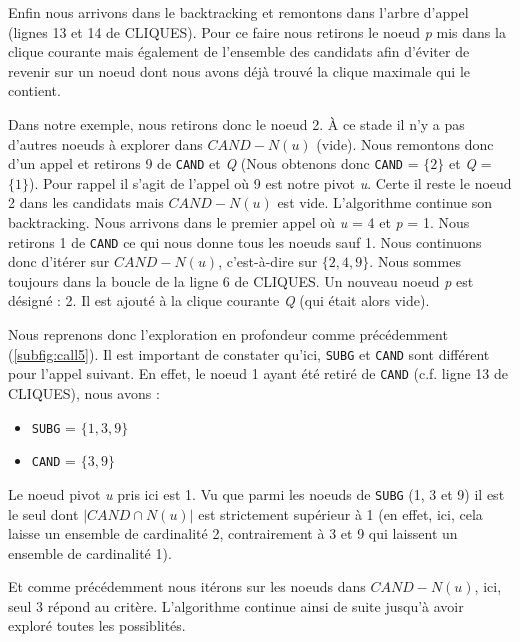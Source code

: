 \documentclass[12pt,a4paper]{article}
\begin{document}
Enfin nous arrivons dans le backtracking et remontons dans l'arbre d'appel (lignes 13 et 14 de CLIQUES). Pour ce faire nous retirons le noeud \emph{p} mis dans la clique courante mais également de l'ensemble des candidats afin d'éviter de revenir sur un noeud dont nous avons déjà trouvé la clique maximale qui le contient.

Dans notre exemple, nous retirons donc le noeud 2. À ce stade il n'y a pas d'autres noeuds à explorer dans \(CAND - N(u)\) (vide). Nous remontons donc d'un appel et retirons 9 de \texttt{CAND} et \emph{Q} (Nous obtenons donc \texttt{CAND} = \(\{2\}\) et \emph{Q} = \(\{1\}\)). Pour rappel il s'agit de l'appel où 9 est notre pivot \emph{u}. Certe il reste le noeud 2 dans les candidats mais \(CAND - N(u)\) est vide.
L'algorithme continue son backtracking. Nous arrivons dans le premier appel où \emph{u} = 4 et \emph{p} = 1. Nous retirons 1 de \texttt{CAND} ce qui nous donne tous les noeuds sauf 1. Nous continuons donc d'itérer sur \(CAND - N(u)\), c'est-à-dire sur \(\{2, 4, 9\}\). Nous sommes toujours dans la boucle de la ligne 6 de CLIQUES. Un nouveau noeud \emph{p} est désigné : 2. Il est ajouté à la clique courante \emph{Q} (qui était alors vide).

Nous reprenons donc l'exploration en profondeur comme précédemment (\ref{subfig:call5}). Il est important de constater qu'ici, \texttt{SUBG} et \texttt{CAND} sont différent pour l'appel suivant. En effet, le noeud 1 ayant été retiré de \texttt{CAND} (c.f. ligne 13 de CLIQUES), nous avons :

\begin{itemize}
  \item \texttt{SUBG} = \(\{1, 3, 9\}\)
  \item \texttt{CAND} = \(\{3, 9\}\)
\end{itemize}
Le noeud pivot \emph{u} pris ici est 1. Vu que parmi les noeuds de \texttt{SUBG} (1, 3 et 9) il est le seul dont \(|CAND \cap N(u)|\) est strictement supérieur à 1 (en effet, ici, cela laisse un ensemble de cardinalité 2, contrairement à 3 et 9 qui laissent un ensemble de cardinalité 1).

Et comme précédemment nous itérons sur les noeuds dans \(CAND - N(u)\), ici, seul 3 répond au critère. L'algorithme continue ainsi de suite jusqu'à avoir exploré toutes les possiblités.
\end{document}
